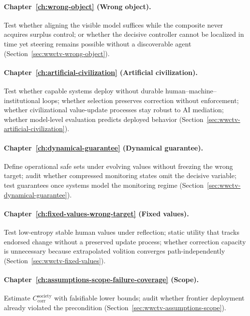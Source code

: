 \paragraph{Chapter~\ref{ch:wrong-object} (Wrong object).}
Test whether aligning the visible model suffices while the composite never acquires surplus control; or whether the decisive controller cannot be localized in time yet steering remains possible without a discoverable agent (Section~\ref{sec:wwctv-wrong-object}).

\paragraph{Chapter~\ref{ch:artificial-civilization} (Artificial civilization).}
Test whether capable systems deploy without durable human--machine--institutional loops; whether selection preserves correction without enforcement; whether civilizational value-update processes stay robust to AI mediation; whether model-level evaluation predicts deployed behavior (Section~\ref{sec:wwctv-artificial-civilization}).

\paragraph{Chapter~\ref{ch:dynamical-guarantee} (Dynamical guarantee).}
Define operational safe sets under evolving values without freezing the wrong target; audit whether compressed monitoring states omit the decisive variable; test guarantees once systems model the monitoring regime (Section~\ref{sec:wwctv-dynamical-guarantee}).

\paragraph{Chapter~\ref{ch:fixed-values-wrong-target} (Fixed values).}
Test low-entropy stable human values under reflection; static utility that tracks endorsed change without a preserved update process; whether correction capacity is unnecessary because extrapolated volition converges path-independently (Section~\ref{sec:wwctv-fixed-values}).

\paragraph{Chapter~\ref{ch:assumptions-scope-failure-coverage} (Scope).}
Estimate \(C_{\text{corr}}^{\text{society}}\) with falsifiable lower bounds; audit whether frontier deployment already violated the precondition (Section~\ref{sec:wwctv-assumptions-scope}).

